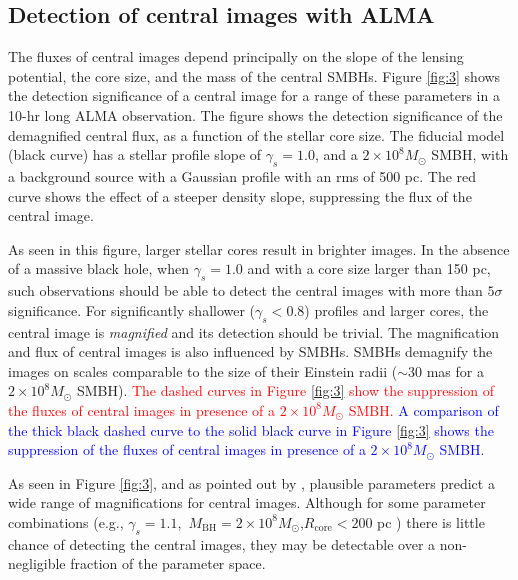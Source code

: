 \documentclass[chicago]{emulateapj}
\newcommand{\blue}{\textcolor{blue}}
\newcommand{\red}{\textcolor{red}}
\begin{document}
\subsection{Detection of central images with ALMA}
The fluxes of central images depend principally on the slope of the lensing potential, the core size, and the mass of the central SMBHs.  Figure \ref{fig:3} shows the detection significance of a central image for a range of these parameters in a 10-hr long ALMA observation. 
The figure shows the detection significance of the demagnified central flux, as a function of the stellar core size.
The fiducial model (black curve) has a stellar profile slope of $\gamma_s=1.0$, and a $2\times10^8M_{\odot}$ SMBH, with a background source 
with a Gaussian profile with an rms of 500 pc.  The red curve shows the effect of a steeper density slope, suppressing the flux of the central image. 




As seen in this figure, larger stellar cores result in brighter images. 
In the absence of a massive black hole, when $\gamma_s=1.0$ and with a core size larger than 150 pc, such observations should be able to detect the central images with more than $5\sigma$ significance. For significantly shallower ($\gamma_s<0.8$) profiles and larger cores, the central image is \emph{magnified} and its detection should be trivial.  The magnification and flux of central images is also influenced by SMBHs.
SMBHs demagnify the images on scales comparable to the size of their Einstein radii ($\sim30$ mas for a $2\times10^8M_{\odot}$ SMBH).
\red{The dashed curves in Figure \ref{fig:3} show the suppression of the fluxes of central images in presence of a $2\times10^8M_{\odot}$ SMBH.}
\blue{A comparison of the thick black dashed curve to the solid black curve in Figure \ref{fig:3} shows the suppression of the fluxes of central images in presence of a $2\times10^8M_{\odot}$ SMBH.}

As seen in Figure \ref{fig:3}, and as pointed out by \citet{Keeton:03}, plausible parameters predict  a wide range of magnifications for   central images. Although for some parameter combinations (e.g., $\gamma_{s}=1.1,$ $M_{\mathrm{BH}} = 2\times10^8 M_{\odot}$,$R_{\mathrm{core}}<200$ pc ) there is little chance of detecting the central images, they may be detectable over a non-negligible fraction of the parameter space.
\end{document}

